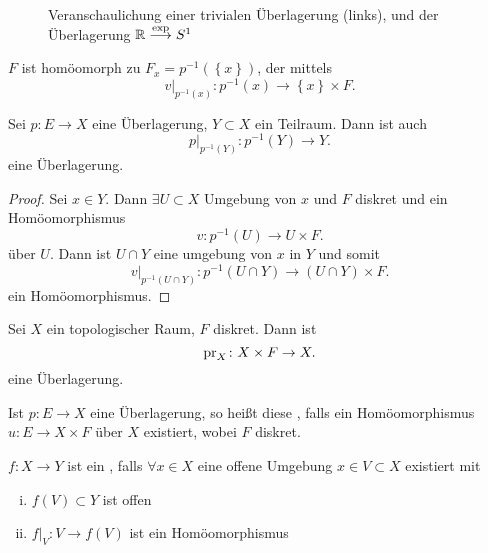 \begin{figure}[ht]
    \centering
    \caption{Veranschaulichung einer trivialen Überlagerung (links), und der Überlagerung $\mathbb{R}\stackrel{\exp }{\longrightarrow}  S^1$}
    \label{fig:definition-überlagerung}
\end{figure}


\begin{remark}
    $F$ ist homöomorph zu  $F_x = p^{-1}(\left \{x\right\} )$, der  mittels
    \[
        v|_{p^{-1}(x)} \colon  p^{-1}(x) \to  \left \{x\right\} \times F
    .\] 
\end{remark}


\begin{lemma}\label{lm:überlagerung-von-teilräumen}
    Sei $p\colon E \to  X$ eine Überlagerung, $Y\subset X$ ein Teilraum. Dann ist auch
    \[
        p|_{p^{-1} (Y)} \colon  p^{-1} (Y) \to  Y
    .\] 
    eine Überlagerung.
\end{lemma}

\begin{proof}
    Sei $x\in Y$. Dann $\exists U\subset X$ Umgebung von $x$ und  $F$ diskret und ein Homöomorphismus
     \[
         v\colon  p^{-1} (U) \to  U\times F
    .\] 
    über $U$. Dann ist $U\cap Y$ eine umgebung von $x$ in $Y$ und somit
     \[
         v|_{p^{-1} (U\cap Y)}\colon p^{-1} (U\cap Y) \to  (U\cap Y) \times F
    .\] 
    ein Homöomorphismus.
\end{proof}

\begin{example}
    Sei $X$ ein topologischer Raum,  $F$ diskret. Dann ist
     \[
    \operatorname{pr}_X \colon  X \times F \to  X
    .\] 
    eine Überlagerung.
\end{example}

\begin{remark}
    Ist $p\colon  E \to  X$ eine Überlagerung, so heißt diese , falls ein Homöomorphismus $u\colon  E \to  X\times F$ über $X$ existiert, wobei  $F$ diskret.
\end{remark}

\begin{definition}
    $f\colon X \to  Y$ ist ein , falls $\forall x\in X$ eine offene Umgebung $x\in V \subset X$ existiert mit
    \begin{enumerate}[i)]
        \item $f(V)\subset Y$ ist offen
        \item $f|_V\colon  V \to  f(V)$ ist ein Homöomorphismus
    \end{enumerate}
\end{definition}

